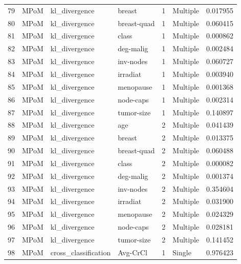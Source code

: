 \begin{tabular}{llllrlr}
79  &     MPoM &          kl\_divergence &       breast &    1 &  Multiple &  0.017955 \\
80  &     MPoM &          kl\_divergence &  breast-quad &    1 &  Multiple &  0.060415 \\
81  &     MPoM &          kl\_divergence &        class &    1 &  Multiple &  0.000862 \\
82  &     MPoM &          kl\_divergence &    deg-malig &    1 &  Multiple &  0.002484 \\
83  &     MPoM &          kl\_divergence &    inv-nodes &    1 &  Multiple &  0.060727 \\
84  &     MPoM &          kl\_divergence &     irradiat &    1 &  Multiple &  0.003940 \\
85  &     MPoM &          kl\_divergence &    menopause &    1 &  Multiple &  0.001368 \\
86  &     MPoM &          kl\_divergence &    node-caps &    1 &  Multiple &  0.002314 \\
87  &     MPoM &          kl\_divergence &   tumor-size &    1 &  Multiple &  0.140897 \\
88  &     MPoM &          kl\_divergence &          age &    2 &  Multiple &  0.041439 \\
89  &     MPoM &          kl\_divergence &       breast &    2 &  Multiple &  0.013375 \\
90  &     MPoM &          kl\_divergence &  breast-quad &    2 &  Multiple &  0.060488 \\
91  &     MPoM &          kl\_divergence &        class &    2 &  Multiple &  0.000082 \\
92  &     MPoM &          kl\_divergence &    deg-malig &    2 &  Multiple &  0.001374 \\
93  &     MPoM &          kl\_divergence &    inv-nodes &    2 &  Multiple &  0.354604 \\
94  &     MPoM &          kl\_divergence &     irradiat &    2 &  Multiple &  0.031900 \\
95  &     MPoM &          kl\_divergence &    menopause &    2 &  Multiple &  0.024329 \\
96  &     MPoM &          kl\_divergence &    node-caps &    2 &  Multiple &  0.028181 \\
97  &     MPoM &          kl\_divergence &   tumor-size &    2 &  Multiple &  0.141452 \\
98  &     MPoM &   cross\_classification &     Avg-CrCl &    1 &    Single &  0.976423 \\

\end{tabular}
